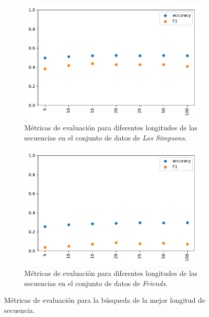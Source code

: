 \begin{figure}[H]
    \centering
    \begin{subfigure}[b]{0.45\textwidth}
        \centering
        \includegraphics[width=\textwidth]{doc/images/seq_len/simpsons.pdf}
        \caption{Métricas de evaluación para diferentes longitudes de las secuencias en el conjunto de datos de \textit{Los Simpsons}.}
        \label{fig:em_seq_len_simpsons}
    \end{subfigure}
    \hfill
    \begin{subfigure}[b]{0.45\textwidth}
        \centering
        \includegraphics[width=\textwidth]{doc/images/seq_len/friends.pdf}
        \caption{Métricas de evaluación para diferentes longitudes de las secuencias en el conjunto de datos de \textit{Friends}.}
        \label{fig:em_seq_len_friends}
    \end{subfigure}
    \caption{Métricas de evaluación para la búsqueda de la mejor longitud de secuencia.}
    \label{fig:em_seq_len}
\end{figure}

